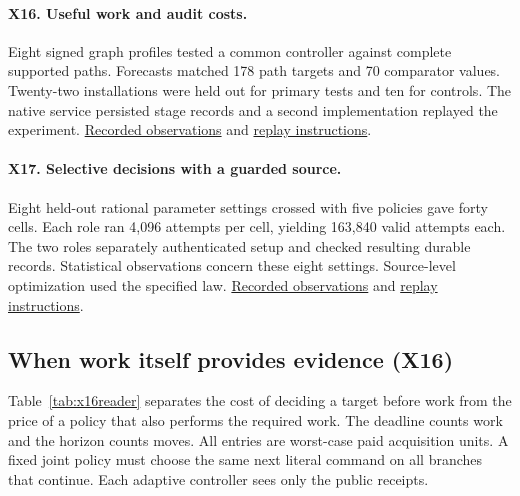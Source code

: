 \paragraph{X16. Useful work and audit costs.} Eight signed graph profiles tested a common controller against complete supported paths. Forecasts matched 178 path targets and 70 comparator values. Twenty-two installations were held out for primary tests and ten for controls. The native service persisted stage records and a second implementation replayed the experiment. \href{https://github.com/Perceptive-Closure/PC-X/blob/a6bf9cefb59f63b8c9dea59daf7e588a82ba07eb/EXPERIMENTS/EXP-X16/results/forecast-agreement.json}{Recorded observations} and \href{https://github.com/Perceptive-Closure/PC-X/blob/a6bf9cefb59f63b8c9dea59daf7e588a82ba07eb/EXPERIMENTS/EXP-X16/README.md}{replay instructions}.

\paragraph{X17. Selective decisions with a guarded source.} Eight held-out rational parameter settings crossed with five policies gave forty cells. Each role ran 4,096 attempts per cell, yielding 163,840 valid attempts each. The two roles separately authenticated setup and checked resulting durable records. Statistical observations concern these eight settings. Source-level optimization used the specified law. \href{https://github.com/Perceptive-Closure/PC-X/blob/899f29dbdcc6e9a81a32bbaf387c3bf270501b10/EXPERIMENTS/EXP-X17/results/statistics/summary.json}{Recorded observations} and \href{https://github.com/Perceptive-Closure/PC-X/blob/899f29dbdcc6e9a81a32bbaf387c3bf270501b10/EXPERIMENTS/EXP-X17/REPRODUCTION.md}{replay instructions}.
\subsection{When work itself provides evidence (X16)}
Table~\ref{tab:x16reader} separates the cost of deciding a target before work from the price of a policy that also performs the required work. The deadline counts work and the horizon counts moves. All entries are worst-case paid acquisition units. A fixed joint policy must choose the same next literal command on all branches that continue. Each adaptive controller sees only the public receipts.

